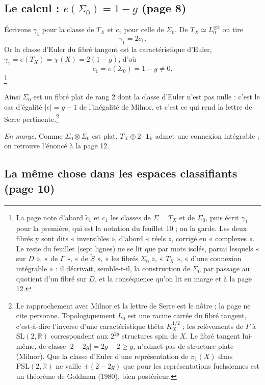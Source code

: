 \documentclass[11pt,a4paper]{article}
\begin{document}
\subsection*{Le calcul : $e(\Sigma_{0}) = 1 - g$ (page 8)}

Écrivons $\gamma_{1}$ pour la classe de $T_{X}$ et $c_{1}$ pour celle de
$\Sigma_{0}$. De $T_{X} \simeq L_{0}^{\otimes 2}$ on tire
\[
  \gamma_{1} = 2 c_{1}.
\]
Or la classe d'Euler du fibré tangent est la caractéristique d'Euler,
$\gamma_{1} = e(T_{X}) = \chi(X) = 2(1-g)$, d'où
\[
  \boxed{c_{1} = e(\Sigma_{0}) = 1 - g \neq 0.}
\]
\footnote{La page note d'abord $\widetilde{c}_{1}$ et $c_{1}$ les classes de
$\Sigma = T_{X}$ et de $\Sigma_{0}$, puis écrit $\gamma_{1}$ pour la
première, qui est la notation du feuillet 10 ; on la garde. Les deux fibrés
y sont dits « inversibles », d'abord « réels », corrigé en « complexes ».
Le reste du feuillet (sept lignes) ne se lit que par mots isolés, parmi
lesquels « sur $D$ », « de $\Gamma$ », « de $\widetilde{S}$ », « les fibrés
$\Sigma_{0}$ », « $T_{X}$ », « d'une connexion intégrable » : il décrivait,
semble-t-il, la construction de $\Sigma_{0}$ par passage au quotient d'un
fibré sur $D$, et la conséquence qu'on lit en marge et à la page 12.}

Ainsi $\Sigma_{0}$ est un fibré plat de rang 2 dont la classe d'Euler n'est
pas nulle : c'est le cas d'égalité $|e| = g - 1$ de l'inégalité de Milnor, et
c'est ce qui rend la lettre de Serre pertinente.\footnote{Le rapprochement
avec Milnor et la lettre de Serre est le nôtre ; la page ne cite personne.
Topologiquement $L_{0}$ est une racine carrée du fibré tangent, c'est-à-dire
l'inverse d'une caractéristique thêta $K_{X}^{1/2}$ ; les relèvements de
$\Gamma$ à $\mathrm{SL}(2,\mathbb{R})$ correspondent aux $2^{2g}$ structures
spin de $X$. Le fibré tangent lui-même, de classe $|2 - 2g| = 2g - 2 \geq
g$, n'admet pas de structure plate (Milnor). Que la classe d'Euler d'une
représentation de $\pi_{1}(X)$ dans $\mathrm{PSL}(2,\mathbb{R})$ ne vaille
$\pm(2 - 2g)$ que pour les représentations fuchsiennes est un théorème de
Goldman (1980), bien postérieur.}

\emph{En marge.} Comme $\Sigma_{0} \otimes \Sigma_{0}$ est plat, $T_{X}
\oplus 2 \cdot \mathbf{1}_{\mathbb{R}}$ admet une connexion
intégrable ; on retrouve l'énoncé à la page 12.

\subsection*{La même chose dans les espaces classifiants (page 10)}
\end{document}
